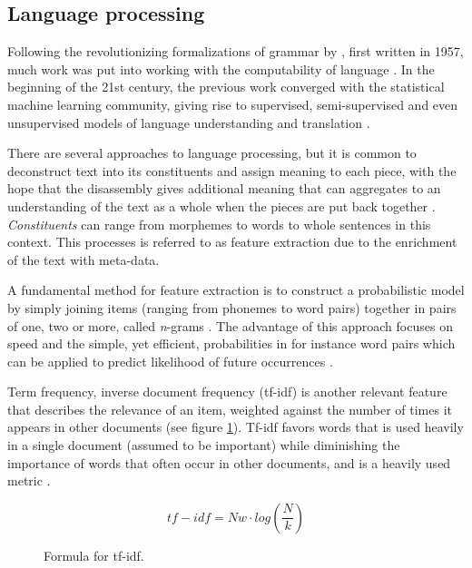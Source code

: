 \documentclass[a4paper]{article}
\begin{document}
\subsection{Language processing}
Following the revolutionizing formalizations of grammar by \cite{Chomsky2002},
first written in 1957, much work was put into working with the computability
of language \citep{Jurafsky2000}. In the beginning of the 21st century,
the previous work converged with the statistical machine learning community,
giving rise to supervised, semi-supervised and even unsupervised models
of language understanding and translation \citep{Jurafsky2000}.

There are several approaches to language processing, but it is common
to deconstruct text into its constituents and assign meaning
to each piece, with the hope that the disassembly gives additional meaning
that can aggregates to an understanding of the text as a whole when the pieces
are put back together \citep{Jurafsky2000}.
\textit{Constituents} can range from morphemes to words to whole sentences in
this context. This processes is referred to as feature extraction due to the
enrichment of the text with meta-data.

A fundamental method for feature extraction is to construct a probabilistic
model by simply joining items (ranging from phonemes to word pairs) together
in pairs of one, two or more, called \textit{n}-grams \citep{Jurafsky2000}.
The advantage of this approach focuses on speed and the simple, yet efficient,
probabilities in for instance word pairs which can be applied to predict
likelihood of future occurrences \citep{Jurafsky2000}.

Term frequency, inverse document frequency (tf-idf) is another relevant feature
that describes the relevance of an item, weighted against the number of
times it appears in other documents \citep{Jurafsky2000} (see figure \ref{fig:tfidf}).
Tf-idf favors words that is used heavily in a
single document (assumed to be important) while diminishing the importance of
words that often occur in other documents, and is a heavily used metric \citep{Jurafsky2000}.

\begin{figure}
\[tf-idf = Nw \cdot log(\frac{N}{k})\]
\caption{Formula for tf-idf.}
\label{fig:tfidf}
\end{figure}
\end{document}
